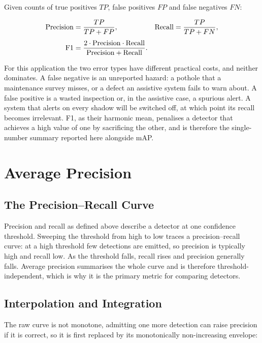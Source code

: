\documentclass[MScCS]{uccthesis}
\begin{document}
Given counts of true positives $TP$, false positives $FP$ and false negatives
$FN$:

\begin{align}
   \mathrm{Precision} &= \frac{TP}{TP + FP}, &
   \mathrm{Recall}    &= \frac{TP}{TP + FN}, \notag \\[4pt]
   \mathrm{F1}        &= \frac{2 \cdot \mathrm{Precision} \cdot \mathrm{Recall}}
                              {\mathrm{Precision} + \mathrm{Recall}} .
   \label{eq:prf}
\end{align}

For this application the two error types have different practical costs, and
neither dominates. A false negative is an unreported hazard: a pothole that a
maintenance survey misses, or a defect an assistive system fails to warn about.
A false positive is a wasted inspection or, in the assistive case, a spurious
alert. A system that alerts on every shadow will be switched off, at which
point its recall becomes irrelevant. F1, as their harmonic mean, penalises a
detector that achieves a high value of one by sacrificing the other, and is
therefore the single-number summary reported here alongside mAP.

\section{Average Precision}
\label{sec:ap}

\subsection{The Precision--Recall Curve}

Precision and recall as defined above describe a detector at one confidence
threshold. Sweeping the threshold from high to low traces a
precision--recall curve: at a high threshold few detections are emitted, so
precision is typically high and recall low. As the threshold falls, recall
rises and precision generally falls. Average precision summarises the whole
curve and is therefore threshold-independent, which is why it is the primary
metric for comparing detectors.

\subsection{Interpolation and Integration}

The raw curve is not monotone, admitting one more detection can raise
precision if it is correct, so it is first replaced by its monotonically
non-increasing envelope:
\end{document}
